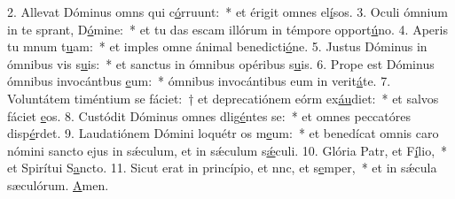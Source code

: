 2. Allevat Dóminus omns qui c\uline{ó}rruunt:~* et érigit omnes el\uline{í}sos.
3. Oculi ómnium in te sprant, D\uline{ó}mine:~* et tu das escam illórum in témpore opport\uline{ú}no.
4. Aperis tu mnum t\uline{u}am:~* et imples omne ánimal benedicti\uline{ó}ne.
5. Justus Dóminus in ómnibus vis s\uline{u}is:~* et sanctus in ómnibus opéribus s\uline{u}is.
6. Prope est Dóminus ómnibus invocántbus \uline{e}um:~* ómnibus invocántibus eum in verit\uline{á}te.
7. Voluntátem timéntium se fáciet:~† et deprecatiónem eórm ex\uline{áu}diet:~* et salvos fáciet \uline{e}os.
8. Custódit Dóminus omnes dlig\uline{é}ntes se:~* et omnes peccatóres disp\uline{é}rdet.
9. Laudatiónem Dómini loquétr os m\uline{e}um:~* et benedícat omnis caro nómini sancto ejus in sǽculum, et in sǽculum s\uline{ǽ}culi.
10. Glória Patr, et F\uline{í}lio,~* et Spirítui S\uline{a}ncto.
11. Sicut erat in princípio, et nnc, et s\uline{e}mper,~* et in sǽcula sæculórum. \uline{A}men.

